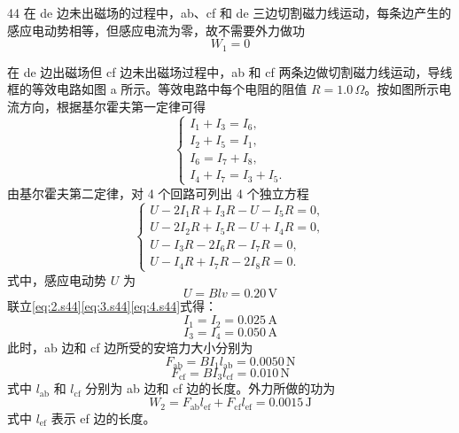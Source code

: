 \begin{solution}{44}
    在 de 边未出磁场的过程中，ab、cf 和 de 三边切割磁力线运动，每条边产生的感应电动势相等，但感应电流为零，故不需要外力做功
    \begin{equation}
        W_{1} = 0
        \label{eq:1.s44}
    \end{equation}

    在 de 边出磁场但 cf 边未出磁场过程中，ab 和 cf 两条边做切割磁力线运动，导线框的等效电路如图 a 所示。等效电路中每个电阻的阻值 $R = 1.0\,\Omega$。按如图所示电流方向，根据基尔霍夫第一定律可得
    \begin{equation}
        \begin{cases}
            I_{1} + I_{3} = I_{6}, \\
            I_{2} + I_{5} = I_{1}, \\
            I_{6} = I_{7} + I_{8}, \\
            I_{4} + I_{7} = I_{3} + I_{5}.
        \end{cases}
        \label{eq:2.s44}
    \end{equation}
    由基尔霍夫第二定律，对 4 个回路可列出 4 个独立方程
    \begin{equation}
        \begin{cases}
            U - 2I_{1}R + I_{3}R - U - I_{5}R = 0, \\
            U - 2I_{2}R + I_{5}R - U + I_{4}R = 0, \\
            U - I_{3}R - 2I_{6}R - I_{7}R = 0, \\
            U - I_{4}R + I_{7}R - 2I_{8}R = 0.
        \end{cases}
        \label{eq:3.s44}
    \end{equation}
    式中，感应电动势 $U$ 为
    \begin{equation}
        U = B l v = 0.20\,\mathrm{V}
        \label{eq:4.s44}
    \end{equation}
    联立\eqref{eq:2.s44}\eqref{eq:3.s44}\eqref{eq:4.s44}式得：
    \begin{equation}
        I_{1} = I_{2} = 0.025\,\mathrm{A}
        \label{eq:5.s44}
    \end{equation}
    \begin{equation}
        I_{3} = I_{4} = 0.050\,\mathrm{A}
        \label{eq:6.s44}
    \end{equation}
    此时，ab 边和 cf 边所受的安培力大小分别为
    \begin{equation}
        F_{\mathrm{ab}} = B I_{1} l_{\mathrm{ab}} = 0.0050\,\mathrm{N}
        \label{eq:7.s44}
    \end{equation}
    \begin{equation}
        F_{\mathrm{cf}} = B I_{3} l_{\mathrm{cf}} = 0.010\,\mathrm{N}
        \label{eq:8.s44}
    \end{equation}
    式中 $l_{\mathrm{ab}}$ 和 $l_{\mathrm{cf}}$ 分别为 ab 边和 cf 边的长度。外力所做的功为
    \begin{equation}
        W_{2} = F_{\mathrm{ab}} l_{\mathrm{ef}} + F_{\mathrm{cf}} l_{\mathrm{ef}} = 0.0015\,\mathrm{J}
        \label{eq:9.s44}
    \end{equation}
    式中 $l_{\mathrm{ef}}$ 表示 ef 边的长度。


\end{solution}
